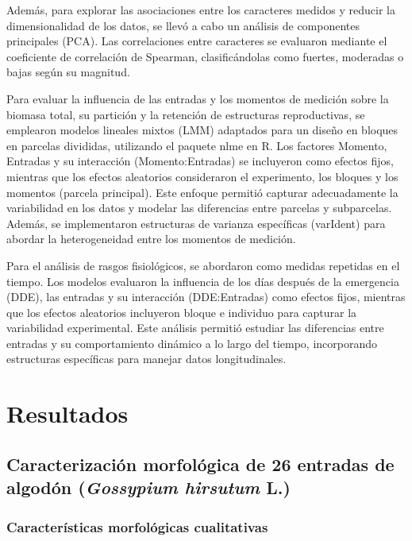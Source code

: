 \documentclass[12pt,oneside]{reedthesis}
\begin{document}
Además, para explorar las asociaciones entre los caracteres medidos y reducir la dimensionalidad de los datos, se llevó a cabo un análisis de componentes principales (PCA). Las correlaciones entre caracteres se evaluaron mediante el coeficiente de correlación de Spearman, clasificándolas como fuertes, moderadas o bajas según su magnitud.

Para evaluar la influencia de las entradas y los momentos de medición sobre la biomasa total, su partición y la retención de estructuras reproductivas, se emplearon modelos lineales mixtos (LMM) adaptados para un diseño en bloques en parcelas divididas, utilizando el paquete nlme en R. Los factores Momento, Entradas y su interacción (Momento:Entradas) se incluyeron como efectos fijos, mientras que los efectos aleatorios consideraron el experimento, los bloques y los momentos (parcela principal). Este enfoque permitió capturar adecuadamente la variabilidad en los datos y modelar las diferencias entre parcelas y subparcelas. Además, se implementaron estructuras de varianza específicas (varIdent) para abordar la heterogeneidad entre los momentos de medición.

Para el análisis de rasgos fisiológicos, se abordaron como medidas repetidas en el tiempo. Los modelos evaluaron la influencia de los días después de la emergencia (DDE), las entradas y su interacción (DDE:Entradas) como efectos fijos, mientras que los efectos aleatorios incluyeron bloque e individuo para capturar la variabilidad experimental. Este análisis permitió estudiar las diferencias entre entradas y su comportamiento dinámico a lo largo del tiempo, incorporando estructuras específicas para manejar datos longitudinales.

\section{Resultados}\label{resultados}

\subsection{\texorpdfstring{Caracterización morfológica de 26 entradas de algodón (\emph{Gossypium hirsutum} L.)}{Caracterización morfológica de 26 entradas de algodón (Gossypium hirsutum L.)}}\label{caracterizaciuxf3n-morfoluxf3gica-de-26-entradas-de-algoduxf3n-gossypium-hirsutum-l.-1}

\subsubsection{Características morfológicas cualitativas}\label{caracteruxedsticas-morfoluxf3gicas-cualitativas}
\end{document}
